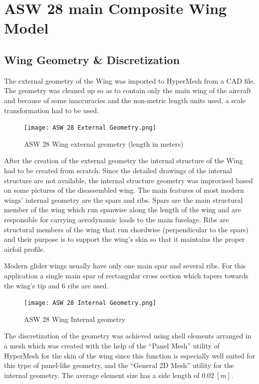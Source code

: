 \section{ASW 28 main Composite Wing Model}
\label{asw-28-main-composite-wing-model}

\subsection{Wing Geometry \&
Discretization}\label{wing-geometry-discretization}

The external geometry of the Wing was imported to HyperMesh from a CAD
file. The geometry was cleaned up so as to contain only the main wing of
the aircraft and because of some inaccuracies and the
non-metric length units used, a scale transformation had to be used.

\begin{figure}[H]
    \centering
    \texttt{[image: ASW 28 External Geometry.png]}
    \caption{ASW 28 Wing external geometry (length in meters)}
\end{figure}

After the creation of the external geometry the internal structure of
the Wing had to be created from scratch. Since the detailed drawings of
the internal structure are not available, the internal structure
geometry was improvised based on some pictures of the disassembled wing.
The main features of most modern wings' internal geometry are the spars
and ribs. Spars are the main structural member of the wing which run
spanwise along the length of the wing and are responsible for carrying
aerodynamic loads to the main fuselage. Ribs are structural members of
the wing that run chordwise (perpendicular to the spars) and their
purpose is to support the wing's skin so that it maintains the proper
airfoil profile.

Modern glider wings usually have only one main spar and several ribs.
For this application a single main spar of rectangular cross section
which tapers towards the wing's tip and 6 ribs are used.

\begin{figure}[H]
    \centering
    \texttt{[image: ASW 28 Internal Geometry.png]}
    \caption{ASW 28 Wing Internal geometry}
\end{figure}


The discretization of the geometry was achieved using shell elements
arranged in a mesh which was created with the help of the ``Panel Mesh''
utility of HyperMesh for the skin of the wing since this function is
especially well suited for this type of panel-like geometry, and the
``General 2D Mesh'' utility for the internal geometry. The average
element size has a side length of \(0.02\ [m] \).

